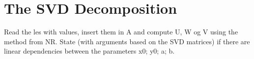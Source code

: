 \section{The SVD Decomposition}
Read the les with values, insert them in A and compute U, W og
V using the method from NR. State (with arguments based on the
SVD matrices) if there are linear dependencies between the parameters
x0; y0; a; b.